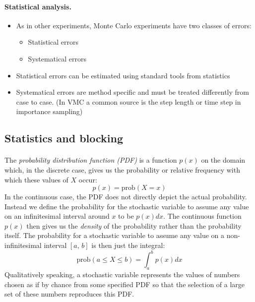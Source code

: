 \documentclass[%
twoside,                 %
final,                   %
10pt]{article}
\begin{document}
\paragraph{Statistical analysis.}
\begin{itemize}
    \item As in other experiments, Monte Carlo experiments have two classes of errors:
\begin{itemize}

      \item Statistical errors

      \item Systematical errors

\end{itemize}

\noindent
    \item Statistical errors can be estimated using standard tools from statistics

    \item Systematical errors are method specific and must be treated differently from case to case. (In VMC a common source is the step length or time step in importance sampling)
\end{itemize}

\noindent

    

\subsection*{Statistics and blocking}

\paragraph{}
The \emph{probability distribution function (PDF)} is a function
$p(x)$ on the domain which, in the discrete case, gives us the
probability or relative frequency with which these values of $X$ occur:
\[
p(x) = \mathrm{prob}(X=x)
\]
In the continuous case, the PDF does not directly depict the
actual probability. Instead we define the probability for the
stochastic variable to assume any value on an infinitesimal interval
around $x$ to be $p(x)dx$. The continuous function $p(x)$ then gives us
the \emph{density} of the probability rather than the probability
itself. The probability for a stochastic variable to assume any value
on a non-infinitesimal interval $[a,\,b]$ is then just the integral:
\[
\mathrm{prob}(a\leq X\leq b) = \int_a^b p(x)dx
\]
Qualitatively speaking, a stochastic variable represents the values of
numbers chosen as if by chance from some specified PDF so that the
selection of a large set of these numbers reproduces this PDF.
\end{document}
